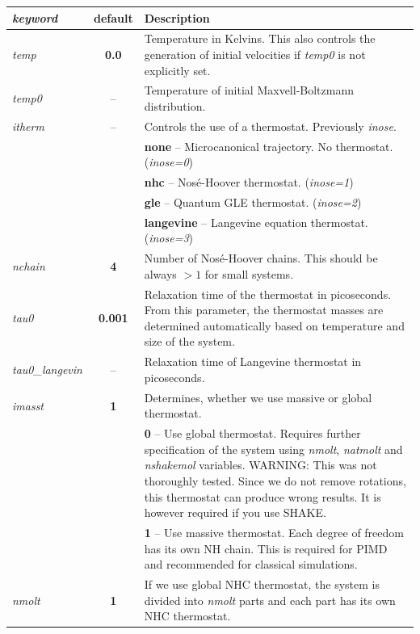\noindent\begin{tabularx}{\textwidth}{lcX}
\textit{keyword} & \textbf{default} & Description \\
\hline
\textit{temp} & \textbf{0.0} &  Temperature in Kelvins.
This also controls the generation of initial velocities if \textit{temp0} is not explicitly set. \\ 
\textit{temp0} & -- &  Temperature of initial Maxvell-Boltzmann distribution. \\
\textit{itherm} & -- &  Controls the use of a thermostat. Previously \textit{inose}. \\
& & \textbf{none} -- Microcanonical trajectory. No thermostat. (\textit{inose=0}) \\
& & \textbf{nhc} -- Nos\'{e}-Hoover thermostat. (\textit{inose=1})\\
& & \textbf{gle} -- Quantum GLE thermostat. (\textit{inose=2})\\
& & \textbf{langevine} -- Langevine equation thermostat. (\textit{inose=3})\\

\textit{nchain} & \textbf{4} & Number of Nos\'{e}-Hoover chains. This should be always $>1$ for small systems. \\

\textit{tau0} & \textbf{0.001} & Relaxation time of the thermostat in picoseconds. From this parameter, 
the thermostat masses are determined automatically based on temperature and size of the system.\cite{Tuckerman_book} \\

\colorbox{black!20}{\textit{tau0\_langevin}}  & -- & Relaxation time of Langevine thermostat in picoseconds. \\

\textit{imasst} & \textbf{1} & Determines, whether we use massive or global thermostat. \\
& & \textbf{0} -- Use global thermostat.
Requires further specification of the system using \textit{nmolt}, \textit{natmolt} and \textit{nshakemol} variables.
WARNING: This was not thoroughly tested.
Since we do not remove rotations, this thermostat can produce wrong results. It is however required if you use SHAKE.\\
& & \textbf{1} -- Use massive thermostat. Each degree of freedom has its own NH chain.
This is required for PIMD and recommended for classical simulations. \\

\textit{nmolt} & \textbf{1} & If we use global NHC thermostat, the system is divided into \textit{nmolt} parts
and each part has its own NHC thermostat. \\


\end{tabularx}
